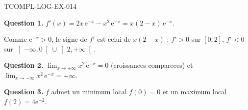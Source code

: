 \begin{corrige}{TCOMPL-LOG-EX-014}

\textbf{Question 1.} $f'(x) = 2x\,\mathrm{e}^{-x} - x^2\,\mathrm{e}^{-x} = x(2-x)\,\mathrm{e}^{-x}$.


Comme $\mathrm{e}^{-x} > 0$, le signe de $f'$ est celui de $x(2-x)$ :
$f' > 0$ sur $[0,2]$, $f' < 0$ sur $\left]-\infty,0\right[ \cup \left]2,+\infty\right[$.

\textbf{Question 2.} $\lim_{x \to +\infty} x^2\,\mathrm{e}^{-x} = 0$ (croissances compareees) et $\lim_{x \to -\infty} x^2\,\mathrm{e}^{-x} = +\infty$.

\textbf{Question 3.} $f$ admet un minimum local $f(0) = 0$ et un maximum local $f(2) = 4\mathrm{e}^{-2}$.

\end{corrige}
